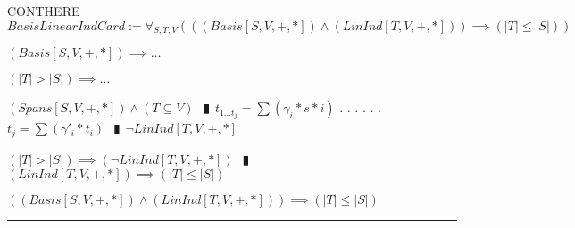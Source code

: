 \documentclass{book}
\newcommand{\abr}{:=}
\newcommand{\cont}{\phantom{.}. . .\phantom{.}}
\newcommand{\pipe}{$\phantom{(}\vrectangleblack\phantom{)}$}
\begin{document}
\begin{comment}
  \begin{shaded} %
  $SubDirSum \abr \forall_{U, V}(((FinDim[V, +, *]) \land (Subspace[U, V, +, *])) \implies (\exists_{W}((Subspace[W, V, +, *]) \land (DirSum[V, U, W, V, +, *]))))$
  \begin{enumerate}
    \lit $FinSubSpace$ \pipe $FinDim[U, +, *]$
    \lit $(FinDimBasis) \land (FinDim[U, +, *])$ \pipe $\exists_{B}(Basis[B, U, +, *])$ \pipe $LinInd[B, U, +, *]$ \pipe $LinInd[B, V, +, *]$ NEWTHM
    \lit $(LinIndExpandBasis) \land (LinInd[B, V, +, *])$ \pipe $\exists_{C}((B \subseteq C) \land (Basis[C, V, +, *]))$
    \lit $(LinSpanSubContains) \land (W \abr LinSpan[C \setminus B])$ \pipe $Subspace[W, V, +, *]$
    \lit $(v \in V) \implies \ldots$
    \begin{enumerate}
      \lit $v = \sum(r_i * c_i) = \sum(r_i * w_i) + \sum(r_i * b_i) \in W + U)$
    \end{enumerate}
    \lit $(v \in V) \implies (v \in U + W)$ \pipe $\forall_{v \in V}(v \in U + W)$ \pipe $SetSum[V, U, W, V +, *]$
    \lit $(v \in U \cap W) \implies \ldots$
    \begin{enumerate}
      \lit TODO : $LinInd$ \pipe $\ldots v = O$
    \end{enumerate}
    \lit $(v \in U \cap W) \iff (v = O)$ \pipe $U \cap W = \{O\}$
    \lit $(SetSum[V, U, W, V +, *]) \land (U \cap W = \{O\})$
    \lit $DirSumEquiv$ \pipe $DirSum[V, U, W, V, +, *]$
  \end{enumerate} \vspace{.75mm} \hrule \vspace{.75mm} \ \\ 
  \end{shaded} %
\end{comment}

CONTHERE
$BasisLinearIndCard \abr \forall_{S, T, V}(((Basis[S, V, +, *]) \land (LinInd[T, V, +, *])) \implies (|T| \leq |S|))$
\begin{enumerate}
  \lit $(Basis[S, V, +, *]) \implies \ldots$
  \begin{enumerate}
      \lit $(|T| > |S|) \implies \ldots$
      \begin{enumerate}
        \lit $(Spans[S, V, +, *]) \land (T \subseteq V)$ \pipe $t_{1 \ldots t_j} = \sum(\gamma_i * s*i)$ \cont
        \lit \cont $t_j = \sum(\gamma'_i * t_i)$ \pipe $\lnot LinInd[T, V, +, *]$
      \end{enumerate}
      \lit $(|T| > |S|) \implies (\lnot LinInd[T, V, +, *])$ \pipe $(LinInd[T, V, +, *]) \implies (|T| \leq |S|)$
   \end{enumerate}
  \lit $((Basis[S, V, +, *]) \land (LinInd[T, V, +, *])) \implies (|T| \leq |S|)$
\end{enumerate} \vspace{.75mm} \hrule \vspace{.75mm} \ \\ 
\end{document}
